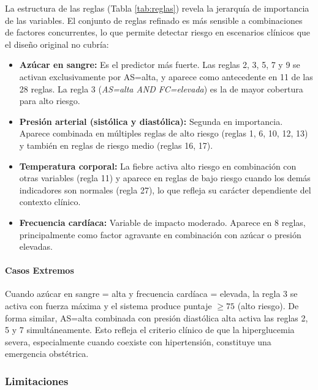 \documentclass[11pt]{article}
\begin{document}
La estructura de las reglas (Tabla \ref{tab:reglas}) revela la jerarqu\'ia de importancia de las variables. El conjunto de reglas refinado es m\'as sensible a combinaciones de factores concurrentes, lo que permite detectar riesgo en escenarios cl\'inicos que el dise\~no original no cubr\'ia:

\begin{itemize}
    \item \textbf{Az\'ucar en sangre:} Es el predictor m\'as fuerte. Las reglas 2, 3, 5, 7 y 9 se activan exclusivamente por AS=alta, y aparece como antecedente en 11 de las 28 reglas. La regla 3 (\textit{AS=alta AND FC=elevada}) es la de mayor cobertura para alto riesgo.
    \item \textbf{Presi\'on arterial (sist\'olica y diast\'olica):} Segunda en importancia. Aparece combinada en m\'ultiples reglas de alto riesgo (reglas 1, 6, 10, 12, 13) y tambi\'en en reglas de riesgo medio (reglas 16, 17).
    \item \textbf{Temperatura corporal:} La fiebre activa alto riesgo en combinaci\'on con otras variables (regla 11) y aparece en reglas de bajo riesgo cuando los dem\'as indicadores son normales (regla 27), lo que refleja su car\'acter dependiente del contexto cl\'inico.
    \item \textbf{Frecuencia card\'iaca:} Variable de impacto moderado. Aparece en 8 reglas, principalmente como factor agravante en combinaci\'on con az\'ucar o presi\'on elevadas.
\end{itemize}

\paragraph{Casos Extremos}

Cuando az\'ucar en sangre = alta y frecuencia card\'iaca = elevada, la regla 3 se activa con fuerza m\'axima y el sistema produce puntaje $\geq 75$ (alto riesgo). De forma similar, AS=alta combinada con presi\'on diast\'olica alta activa las reglas 2, 5 y 7 simult\'aneamente. Esto refleja el criterio cl\'inico de que la hiperglucemia severa, especialmente cuando coexiste con hipertensi\'on, constituye una emergencia obst\'etrica.


\subsubsection{Limitaciones}
\end{document}
